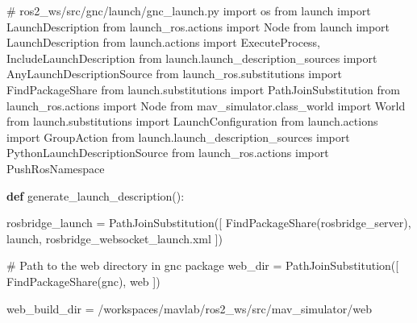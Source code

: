 \documentclass[
  letterpaper,
  DIV=11,
  numbers=noendperiod]{scrreprt}
\newenvironment{Shaded}{\begin{snugshade}}{\end{snugshade}}
\newcommand{\CommentTok}[1]{\textcolor[rgb]{0.37,0.37,0.37}{#1}}
\newcommand{\ImportTok}[1]{\textcolor[rgb]{0.00,0.46,0.62}{#1}}
\newcommand{\KeywordTok}[1]{\textcolor[rgb]{0.00,0.23,0.31}{\textbf{#1}}}
\newcommand{\NormalTok}[1]{\textcolor[rgb]{0.00,0.23,0.31}{#1}}
\newcommand{\OperatorTok}[1]{\textcolor[rgb]{0.37,0.37,0.37}{#1}}
\newcommand{\StringTok}[1]{\textcolor[rgb]{0.13,0.47,0.30}{#1}}
\begin{document}
\begin{Shaded}
\begin{Highlighting}[]
\CommentTok{\# ros2\_ws/src/gnc/launch/gnc\_launch.py}
\ImportTok{import}\NormalTok{ os}
\ImportTok{from}\NormalTok{ launch }\ImportTok{import}\NormalTok{ LaunchDescription}
\ImportTok{from}\NormalTok{ launch\_ros.actions }\ImportTok{import}\NormalTok{ Node}
\ImportTok{from}\NormalTok{ launch }\ImportTok{import}\NormalTok{ LaunchDescription}
\ImportTok{from}\NormalTok{ launch.actions }\ImportTok{import}\NormalTok{ ExecuteProcess, IncludeLaunchDescription}
\ImportTok{from}\NormalTok{ launch.launch\_description\_sources }\ImportTok{import}\NormalTok{ AnyLaunchDescriptionSource}
\ImportTok{from}\NormalTok{ launch\_ros.substitutions }\ImportTok{import}\NormalTok{ FindPackageShare}
\ImportTok{from}\NormalTok{ launch.substitutions }\ImportTok{import}\NormalTok{ PathJoinSubstitution}
\ImportTok{from}\NormalTok{ launch\_ros.actions }\ImportTok{import}\NormalTok{ Node}
\ImportTok{from}\NormalTok{ mav\_simulator.class\_world }\ImportTok{import}\NormalTok{ World}
\ImportTok{from}\NormalTok{ launch.substitutions }\ImportTok{import}\NormalTok{ LaunchConfiguration}
\ImportTok{from}\NormalTok{ launch.actions }\ImportTok{import}\NormalTok{ GroupAction}
\ImportTok{from}\NormalTok{ launch.launch\_description\_sources }\ImportTok{import}\NormalTok{ PythonLaunchDescriptionSource}
\ImportTok{from}\NormalTok{ launch\_ros.actions }\ImportTok{import}\NormalTok{ PushRosNamespace}

\KeywordTok{def}\NormalTok{ generate\_launch\_description():}

\NormalTok{    rosbridge\_launch }\OperatorTok{=}\NormalTok{ PathJoinSubstitution([}
\NormalTok{        FindPackageShare(}\StringTok{\textquotesingle{}rosbridge\_server\textquotesingle{}}\NormalTok{),}
        \StringTok{\textquotesingle{}launch\textquotesingle{}}\NormalTok{,}
        \StringTok{\textquotesingle{}rosbridge\_websocket\_launch.xml\textquotesingle{}}
\NormalTok{    ])}

    \CommentTok{\# Path to the web directory in gnc package}
\NormalTok{    web\_dir }\OperatorTok{=}\NormalTok{ PathJoinSubstitution([}
\NormalTok{        FindPackageShare(}\StringTok{\textquotesingle{}gnc\textquotesingle{}}\NormalTok{),}
        \StringTok{\textquotesingle{}web\textquotesingle{}}
\NormalTok{    ])}

\NormalTok{    web\_build\_dir }\OperatorTok{=} \StringTok{\textquotesingle{}/workspaces/mavlab/ros2\_ws/src/mav\_simulator/web\textquotesingle{}}


\end{Highlighting}
\end{Shaded}
\end{document}
